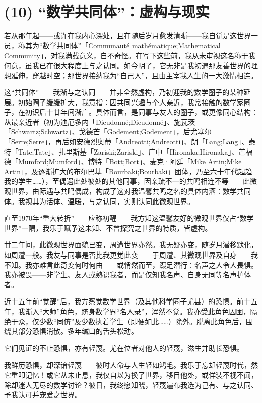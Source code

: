 \section{(10) “数学共同体”：虚构与现实}

若从那年起——或许在我内心深处，且在随后岁月愈发清晰——我自觉是这世界一员，称其为“数学共同体”「Communauté mathématique;Mathematical Community」，对我满载意义，自不奇怪。在写下这些前，我从未审视这名称于我何意，虽我已在很大程度上与之认同。如今明了，它无非是我初遇那友善世界的理想延伸，穿越时空；那世界接纳我为“自己人”，且由主宰我人生的一大激情相连。

这“共同体”——我渐与之认同——并非全然虚构，乃初迎我的数学圈子的某种延展。初始圈子缓缓扩大，我意指：因共同兴趣与个人亲近，我常接触的数学家圈子，在初识后十廿年间渐广。具体而言，是同事与友人的圈子，或更像同心结构：从最亲近者（初为迪厄多内「Dieudonné;Dieudonné」、施瓦茨「Schwartz;Schwartz」、戈德芒「Godement;Godement」，后尤塞尔「Serre;Serre」，再后如安德烈奥蒂「Andreotti;Andreotti」、朗「Lang;Lang」、泰特「Tate;Tate」、扎里斯基「Zariski;Zariski」、广中「Hironaka;Hironaka」、芒福德「Mumford;Mumford」、博特「Bott;Bott」、麦克·阿廷「Mike Artin;Mike Artin」，及逐渐扩大的布尔巴基「Bourbaki;Bourbaki」团体，乃至六十年代起趋我的学生……），至偶遇此处彼处的其他同事，因亲疏不一的共鸣相连不等——此微观世界，由际遇与共鸣偶成，构成了这对我温馨共鸣之名的具体内涵：数学共同体。我视其为活体、温暖，与之认同，实则认同此微观世界。

直至1970年“重大转折”——应称初醒——我方知这温馨友好的微观世界仅占“数学世界”一隅，我乐于赋予这未知、不曾探究之世界的特质，皆虚构。

廿二年间，此微观世界面貌已变，周遭世界亦然。我无疑亦变，随岁月潜移默化，如周遭一般。我友与同事是否比我更觉此变——于周遭、其微观世界及自身——我不知。我亦难言此奇变何时何由——或悄然而至，蹑足潜行：名声之人令人畏惧。我亦被畏——非学生、友人或熟识我者，而是仅知我名声、自身无同等名声护体者。

近十五年前“觉醒”后，我方察觉数学世界（及其他科学圈子尤甚）的恐惧。前十五年，我渐入“大师”角色，跻身数学界“名人录”，浑然不觉。我亦受此角色囚困，隔绝于众，仅少数“同侪”及少数执着学生（即便如此……）除外。脱离此角色后，围绕其部分恐惧消散。多年缄口的舌头松动。

它们见证的不止恐惧，亦有轻蔑。尤在位者对他人的轻蔑，滋生并助长恐惧。

我鲜历恐惧，却深谙轻蔑——彼时人命与人生轻如鸿毛。我乐于忘却轻蔑时代，然它重叩记忆！或它从未止息，我仅自以为换了世界，移目他处，或佯装不视不闻，除却迷人无尽的数学讨论？彼日，我终愿知晓，轻蔑遍布我选为己有、与之认同、予我认可并宠爱之世界。